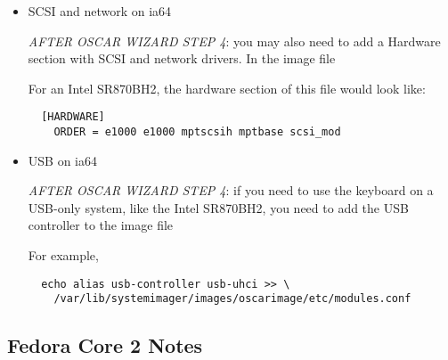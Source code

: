 \begin{itemize}
\begin{verbatim}
  [KERNEL0]
    PATH = /boot/efi//EFI/redhat/vmlinuz-2.4.21-20.EL
    INITRD = /boot/efi//EFI/redhat/initrd-2.4.21-20.EL.img
    LABEL = 2.4.21-20.EL
\end{verbatim}

where 2.4.21-20.EL is the kernel for Red Hat Enterprise Linux 3 (Update 3)
you should substitute your kernel version if you're not running Update 3.

{\bf Note: Note carefully the \emph{DOUBLE SLASH} in the PATH and INITRD lines!}


\item SCSI and network on ia64

\emph{AFTER OSCAR WIZARD STEP 4}: you may also need to add a Hardware section with
SCSI and network drivers.  In the image file


For an Intel SR870BH2, the hardware section of this file would look like:

\begin{verbatim}
  [HARDWARE]
    ORDER = e1000 e1000 mptscsih mptbase scsi_mod
\end{verbatim}


\item USB on ia64

\emph{AFTER OSCAR WIZARD STEP 4}: if you need to use the keyboard on a USB-only
system, like the Intel SR870BH2, you need to add the USB controller to the
image file


For example,

\begin{verbatim}
  echo alias usb-controller usb-uhci >> \
    /var/lib/systemimager/images/oscarimage/etc/modules.conf
\end{verbatim}

\end{itemize}


\subsection{Fedora Core 2 Notes}
\label{subsec:fc2notes}

